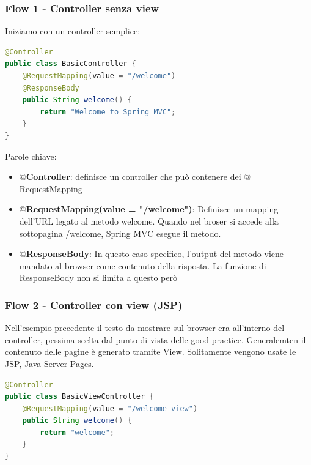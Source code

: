 \documentclass[11pt,a4paper]{book}
\begin{document}
\subsubsection{Flow 1 - Controller senza view} \label{flow1}
Iniziamo con un controller semplice:
\begin{lstlisting}[language = Java]
@Controller
public class BasicController {
	@RequestMapping(value = "/welcome")
	@ResponseBody
	public String welcome() {
		return "Welcome to Spring MVC";
	}
}
\end{lstlisting}
Parole chiave:
\begin{itemize}
	\item \textbf{$@$Controller}: definisce un controller che può contenere dei $@$RequestMapping
	\item \textbf{$@$RequestMapping(value = "/welcome")}: Definisce un mapping dell'URL legato al metodo welcome. Quando nel broser si accede alla sottopagina /welcome, Spring MVC esegue il metodo.
	\item \textbf{$@$ResponseBody}: In questo caso specifico, l'output del metodo viene mandato al browser come contenuto della risposta. La funzione di ResponseBody non si limita a questo però
\end{itemize}

\subsubsection{Flow 2 - Controller con view (JSP)} \label{flow2}
Nell'esempio precedente il testo da mostrare sul browser era all'interno del controller, pessima scelta dal punto di vista delle good practice. Generalemten il contenuto delle pagine è generato tramite View. Solitamente vengono usate le JSP, Java Server Pages.

\begin{lstlisting}[language = Java]
@Controller
public class BasicViewController {
	@RequestMapping(value = "/welcome-view")
	public String welcome() {
		return "welcome";
	}
}
\end{lstlisting}
\end{document}

